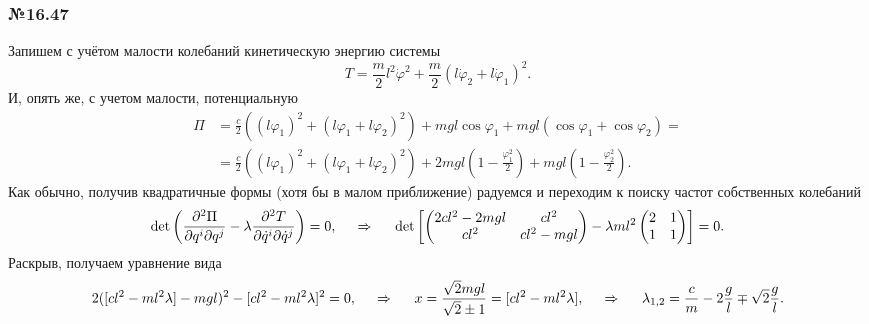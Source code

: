 \subsubsection*{№16.47}

Запишем с учётом малости колебаний кинетическую энергию системы
\begin{equation*}
    T = \frac{m}{2} l^2 \dot{\varphi}^2 + \frac{m}{2} \left(
        l \dot{\varphi}_2 + l \dot{\varphi}_1
    \right)^2.
\end{equation*}
И, опять же, с учетом малости, потенциальную
\begin{align*}
    \Pi &= \frac{c}{2} \left(
        (l \varphi_1)^2 + (l \varphi_1 + l \varphi_2)^2
    \right) + 
    m g l \cos \varphi_1 + m  g l (\cos \varphi_1 + \cos \varphi_2) = \\
    &= 
    \frac{c}{2} \left(
        (l \varphi_1)^2 + (l \varphi_1 + l \varphi_2)^2
    \right) + 2 m g l \left(1 - \frac{\varphi_1^2}{2}\right) + mgl \left(1 - \frac{\varphi_2^2}{2}\right).
\end{align*}
Как обычно, получив квадратичные формы (хотя бы в малом приближение) радуемся и переходим к поиску частот собственных колебаний
\begin{equation*}
     \det \left(
     \frac{\partial^2 \Pi}{\partial q^i \partial q^j} - \lambda \frac{\partial^2 T}{\partial \dot{q}^i \partial \dot{q}^j}\right) = 0,
     \hspace{0.5cm} \Rightarrow \hspace{0.5cm}
     \det\left[
        \begin{pmatrix}
            2cl^2 - 2 mgl & c l^2 \\
            c l^2 & cl^2  - mgl \\
        \end{pmatrix} - 
        \lambda 
        ml^2\begin{pmatrix}
            2 & 1 \\
            1 & 1 \\
        \end{pmatrix}
     \right] = 0.
\end{equation*}
Раскрыв, получаем уравнение вида
\begin{equation*}
    2 ([cl^2-ml^2 \lambda] - mgl)^2 - [cl^2-ml^2 \lambda]^2 = 0,
    \hspace{0.5cm} \Rightarrow \hspace{0.5cm}
    x = \frac{\sqrt{2} m g l}{\sqrt{2} \pm 1} = [cl^2-ml^2 \lambda],
    \hspace{0.5cm} \Rightarrow \hspace{0.5cm}
    \lambda_{1, 2} = \frac{c}{m} -  2\frac{g}{l} \mp \sqrt{2} \frac{g}{l}.
\end{equation*}
